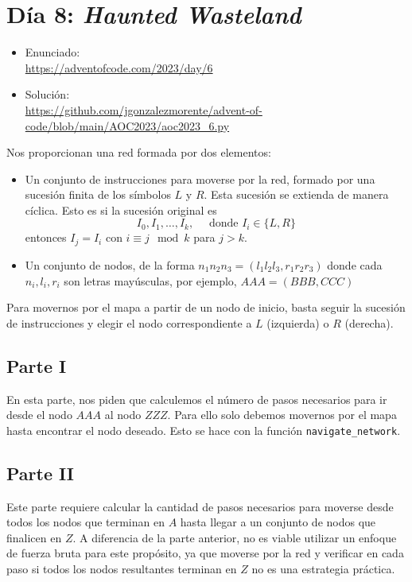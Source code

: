 \documentclass[a4paper,12pt]{article}
\begin{document}
\section{Día 8: \textnormal{ \it Haunted Wasteland }}
\begin{itemize}
    \item Enunciado: \\
    \href{https://adventofcode.com/2023/day/5}{https://adventofcode.com/2023/day/6}
    \item Solución: \\ 
    \href{https://github.com/jgonzalezmorente/advent-of-code/blob/main/AOC2023/aoc2023_6.py}{https://github.com/jgonzalezmorente/advent-of-code/blob/main/AOC2023/aoc2023\_6.py}
\end{itemize}

Nos proporcionan una red formada por dos elementos:
\begin{itemize}
    \item Un conjunto de instrucciones para moverse por la red, formado por una sucesión finita de los símbolos $L$ y $R$. Esta sucesión se extienda de manera cíclica. Esto es si la sucesión original es
    $$I_0, I_1, \dots, I_k, \quad\text{ donde } I_i\in\{L,R\}$$
    entonces $I_j=I_i$ con $i\equiv j\mod k$ para $j>k$.
    \item Un conjunto de nodos, de la forma $n_1n_2n_3 = (l_1l_2l_3, r_1r_2r_3)$ donde cada $n_i, l_i, r_i$ son letras mayúsculas, por ejemplo, $AAA=(BBB, CCC)$
\end{itemize}
Para movernos por el mapa a partir de un nodo de inicio, basta seguir la sucesión de instrucciones y elegir el nodo correspondiente a $L$ (izquierda) o $R$ (derecha). 

\subsection{Parte I}
En esta parte, nos piden que calculemos el número de pasos necesarios para ir desde el nodo $AAA$ al nodo $ZZZ$. Para ello solo debemos movernos por el mapa hasta encontrar el nodo deseado. Esto se hace con la función \lstinline{navigate_network}.

\subsection{Parte II}

Este parte requiere calcular la cantidad de pasos necesarios para moverse desde todos los nodos que terminan en $A$ hasta llegar a un conjunto de nodos que finalicen en $Z$. A diferencia de la parte anterior, no es viable utilizar un enfoque de fuerza bruta para este propósito, ya que moverse por la red y verificar en cada paso si todos los nodos resultantes terminan en $Z$ no es una estrategia práctica.
\end{document}
